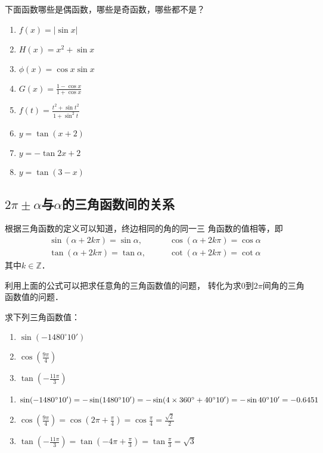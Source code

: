\begin{ex}
    下面函数哪些是偶函数，哪些是奇函数，哪些都不是？
\begin{multicols}{2}
\begin{enumerate}
    \item $f(x) =|\sin x|$
    \item $H(x)=x^2 +\sin x$
    \item $\phi(x)=\cos x\sin x$
    \item $G(x)=\frac{1-\cos x}{1+\cos x}$
    \item $f(t)=\frac{t^2+\sin t^2}{1+\sin^2 t}$
    \item $y=\tan (x+2)$
    \item $y=-\tan 2x+2$
    \item $y=\tan (3-x)$
\end{enumerate}
\end{multicols}
\end{ex}

\subsection{$2\pi\pm\alpha$与$\alpha$的三角函数间的关系}
根据三角函数的定义可以知道，终边相同的角的同一三
角函数的值相等，即
\begin{equation}
\begin{split}
    \sin(\alpha+2k\pi )=\sin\alpha,&\qquad \cos(\alpha+2k\pi )=\cos\alpha \\
\tan(\alpha+2k\pi ) =\tan\alpha,&\qquad \cot(\alpha+2k\pi )=\cot\alpha
\end{split}
\end{equation}
其中$k\in\mathbb{Z}$．

利用上面的公式可以把求任意角的三角函数值的问题，
转化为求0到$2\pi$间角的三角函数值的问题．

\begin{example}
    求下列三角函数值：
\begin{multicols}{3}
\begin{enumerate}
    \item $\sin(-1480^{\circ}10')$
    \item $\cos\left(\frac{9\pi}{4}\right)$
    \item $\tan\left(-\frac{11\pi}{3}\right)$
\end{enumerate}
\end{multicols}
\end{example}

\begin{solution}
\begin{enumerate}
    \item 
$\sin(-1480^{\circ}10')=-\sin(1480^{\circ}10')=-\sin(4\times 360^{\circ}+40^{\circ}10')=-\sin 40^{\circ}10'=-0.6451$
\item $\cos\left(\frac{9\pi}{4}\right)=\cos\left(2\pi+\frac{\pi}{4}\right)=\cos\frac{\pi}{4}=\frac{\sqrt{2}}{2}$
\item $\tan\left(-\frac{11\pi}{3}\right)=\tan\left(-4\pi+\frac{\pi}{3}\right)=\tan\frac{\pi}{3}=\sqrt{3}$
\end{enumerate}
\end{solution}

